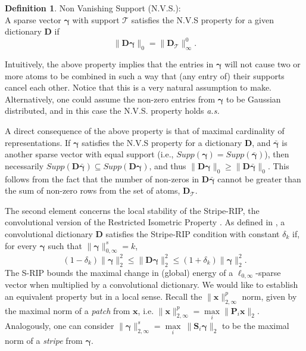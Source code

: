 \documentclass[10pt,journal]{IEEEtran}
\def\x{{\mathbf x}}
\def\D{{\mathbf D}}
\def\gama{{\boldsymbol \gamma}}
\def\Loi{{\ell_{0,\infty}}}
\theoremstyle{plain}
\theoremstyle{definition}
\newtheorem{defn}[thm]{Definition} %
\begin{document}
\begin{defn}{Non Vanishing Support (N.V.S.):}\\
	A sparse vector $\gama$ with support $\mathcal{T}$ satisfies the N.V.S property for a given dictionary $\D$ if 
	\begin{equation}
		\| \D \gama \|_0 = \|\D_\mathcal{T}\|^0_{\infty}.
	\end{equation}
	\label{def:N.V.S.Property}
\end{defn}
Intuitively, the above property implies that the entries in $\gama$ will not cause two or more atoms to be combined in such a way that (any entry of) their supports cancel each other. Notice that this is a very natural assumption to make. %
Alternatively, one could assume the non-zero entries from $\gama$ to be Gaussian distributed, and in this case the N.V.S. property holds \emph{a.s.}

A direct consequence of the above property is that of maximal cardinality of representations. If $\gama$ satisfies the N.V.S property for a dictionary $\D$, and $\bar{\gama}$ is another sparse vector with equal support (i.e., $Supp(\gama) = Supp(\bar{\gama})$), then necessarily $Supp(\D\bar{\gama}) \subseteq Supp(\D\gama)$, and thus $\|\D\gama\|_0 \geq \|\D\bar{\gama}\|_0$. This follows from the fact that the number of non-zeros in $\D\bar{\gama}$ cannot be greater than the sum of non-zero rows from the set of atoms, $\D_\mathcal{T}$. 

The second element concerns the local stability of the Stripe-RIP, the convolutional version of the Restricted Isometric Property \cite{Candes2005}. As defined in \cite{WorkingLocallyThinkingGlobally}, a convolutional dictionary $\D$ satisfies the Stripe-RIP condition with constant $\delta_k$ if, for every $\gama$ such that $\|\gama\|^s_{0,\infty}=k$,
\begin{equation} \label{Eq:SRIP}
	(1-\delta_k)\|\gama\|^2_2 \leq \|\D\gama\|^2_2 \leq (1+\delta_k)\|\gama\|^2_2.
\end{equation}
The S-RIP bounds the maximal change in (global) energy of a $\Loi$-sparse vector when multiplied by a convolutional dictionary. We would like to establish an equivalent property but in a local sense. Recall the $\|\x\|^p_{2,\infty}$ norm, given by the maximal norm of a \emph{patch} from $\x$, i.e. $\|\x\|^p_{2,\infty} = \underset{i}{\max} \|\mathbf{P}_i\x\|_2$. Analogously, one can consider $\|\gama\|^s_{2,\infty} = \underset{i}{\max}\ \|\mathbf{S}_i\gama\|_2$ to be the maximal norm of a \emph{stripe} from $\gama$.
\end{document}
